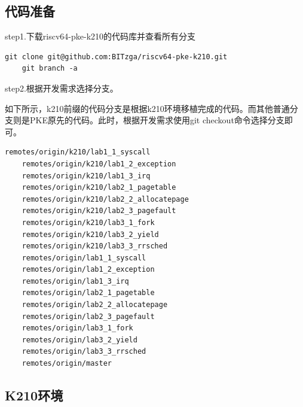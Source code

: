 \subsection{代码准备}

step1.下载riscv64-pke-k210的代码库并查看所有分支

\begin{lstlisting}[caption={下载代码库}, label={lst:download_code}]
    git clone git@github.com:BITzga/riscv64-pke-k210.git
    git branch -a
\end{lstlisting}

step2.根据开发需求选择分支。

如下所示，k210前缀的代码分支是根据k210环境移植完成的代码。而其他普通分支则是PKE原先的代码。此时，根据开发需求使用git checkout命令选择分支即可。

\begin{lstlisting}[caption={分支列表}, label={lst:branch_list}]
    remotes/origin/k210/lab1_1_syscall
    remotes/origin/k210/lab1_2_exception
    remotes/origin/k210/lab1_3_irq
    remotes/origin/k210/lab2_1_pagetable
    remotes/origin/k210/lab2_2_allocatepage
    remotes/origin/k210/lab2_3_pagefault
    remotes/origin/k210/lab3_1_fork
    remotes/origin/k210/lab3_2_yield
    remotes/origin/k210/lab3_3_rrsched
    remotes/origin/lab1_1_syscall
    remotes/origin/lab1_2_exception
    remotes/origin/lab1_3_irq
    remotes/origin/lab2_1_pagetable
    remotes/origin/lab2_2_allocatepage
    remotes/origin/lab2_3_pagefault
    remotes/origin/lab3_1_fork
    remotes/origin/lab3_2_yield
    remotes/origin/lab3_3_rrsched
    remotes/origin/master
\end{lstlisting}

\subsection{K210环境}

